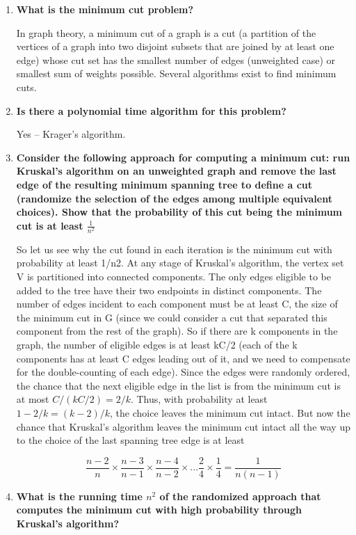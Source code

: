\documentclass[a4paper,11pt]{article}
\begin{document}
\begin{enumerate}
\def\labelenumi{\arabic{enumi}.}
\item
  \textbf{What is the minimum cut problem?}

  In graph theory, a minimum cut of a graph is a cut (a partition of the
  vertices of a graph into two disjoint subsets that are joined by at
  least one edge) whose cut set has the smallest number of edges
  (unweighted case) or smallest sum of weights possible. Several
  algorithms exist to find minimum cuts.
\item
  \textbf{Is there a polynomial time algorithm for this problem?}

  Yes -- Krager's algorithm.
\item
  \textbf{Consider the following approach for computing a minimum cut:
  run Kruskal's algorithm on an unweighted graph and remove the last
  edge of the resulting minimum spanning tree to define a cut (randomize
  the selection of the edges among multiple equivalent choices). Show
  that the probability of this cut being the minimum cut is at least
  $\frac{1}{n^2}$}

  So let us see why the cut found in each iteration is the minimum cut
  with probability at least 1/n2. At any stage of Kruskal's algorithm,
  the vertex set V is partitioned into connected components. The only
  edges eligible to be added to the tree have their two endpoints in
  distinct components. The number of edges incident to each component
  must be at least C, the size of the minimum cut in G (since we could
  consider a cut that separated this component from the rest of the
  graph). So if there are k components in the graph, the number of
  eligible edges is at least kC/2 (each of the k components has at least
  C edges leading out of it, and we need to compensate for the
  double-counting of each edge). Since the edges were randomly ordered,
  the chance that the next eligible edge in the list is from the minimum
  cut is at most $C/(kC/2) = 2/k$. Thus, with probability at least
  $1 - 2/k = (k - 2)/k$, the choice leaves the minimum cut intact. But
  now the chance that Kruskal's algorithm leaves the minimum cut intact
  all the way up to the choice of the last spanning tree edge is at
  least

  \[\frac{n - 2}{n} \times \frac{n - 3}{n - 1} \times \frac{n - 4}{n - 2} \times ... \frac{2}{4} \times \frac{1}{4} = \frac{1}{n (n - 1)}\]
\item
  \textbf{What is the running time $n^2$ of the randomized approach that
  computes the minimum cut with high probability through Kruskal's
  algorithm?}


\end{enumerate}
\end{document}
